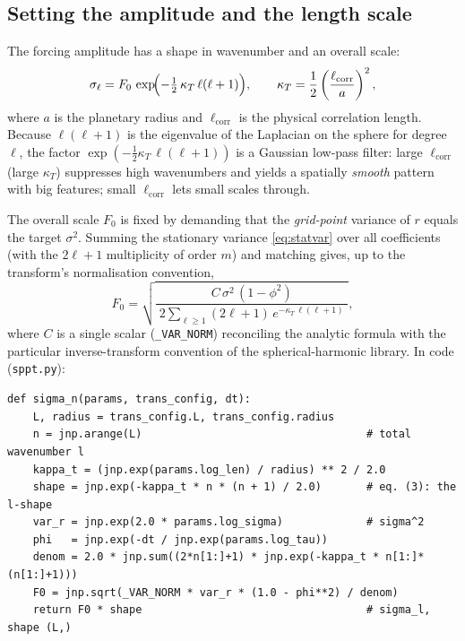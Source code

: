 \documentclass[11pt]{article}
\newcommand{\code}[1]{\texttt{#1}}
\begin{document}
\subsection{Setting the amplitude and the length scale}

The forcing amplitude has a shape in wavenumber and an overall scale:
\begin{equation}
  \sigma_\ell = F_0\, \exp\!\Bigl(-\tfrac{1}{2}\,\kappa_T\,\ell(\ell+1)\Bigr),
  \qquad
  \kappa_T = \frac{1}{2}\left(\frac{\ell_{\text{corr}}}{a}\right)^{2},
  \label{eq:sigmaell}
\end{equation}
where $a$ is the planetary radius and $\ell_{\text{corr}}$ is the physical
correlation length. Because $\ell(\ell+1)$ is the eigenvalue of the Laplacian on
the sphere for degree $\ell$, the factor $\exp(-\tfrac12\kappa_T\,\ell(\ell+1))$
is a Gaussian low-pass filter: large $\ell_{\text{corr}}$ (large $\kappa_T$)
suppresses high wavenumbers and yields a spatially \emph{smooth} pattern with big
features; small $\ell_{\text{corr}}$ lets small scales through.

The overall scale $F_0$ is fixed by demanding that the \emph{grid-point} variance
of $r$ equals the target $\sigma^2$. Summing the stationary variance
\eqref{eq:statvar} over all coefficients (with the $2\ell+1$ multiplicity of
order $m$) and matching gives, up to the transform's normalisation convention,
\begin{equation}
  F_0 = \sqrt{\frac{\;C\,\sigma^2\,(1-\phi^2)\;}
                   {\;2\sum_{\ell\ge 1}(2\ell+1)\,e^{-\kappa_T\,\ell(\ell+1)}\;}},
  \label{eq:F0}
\end{equation}
where $C$ is a single scalar (\code{\_VAR\_NORM}) reconciling the analytic
formula with the particular inverse-transform convention of the spherical-harmonic
library. In code (\code{sppt.py}):

\begin{lstlisting}
def sigma_n(params, trans_config, dt):
    L, radius = trans_config.L, trans_config.radius
    n = jnp.arange(L)                                   # total wavenumber l
    kappa_t = (jnp.exp(params.log_len) / radius) ** 2 / 2.0
    shape = jnp.exp(-kappa_t * n * (n + 1) / 2.0)       # eq. (3): the l-shape
    var_r = jnp.exp(2.0 * params.log_sigma)             # sigma^2
    phi   = jnp.exp(-dt / jnp.exp(params.log_tau))
    denom = 2.0 * jnp.sum((2*n[1:]+1) * jnp.exp(-kappa_t * n[1:]*(n[1:]+1)))
    F0 = jnp.sqrt(_VAR_NORM * var_r * (1.0 - phi**2) / denom)
    return F0 * shape                                   # sigma_l, shape (L,)
\end{lstlisting}
\end{document}
